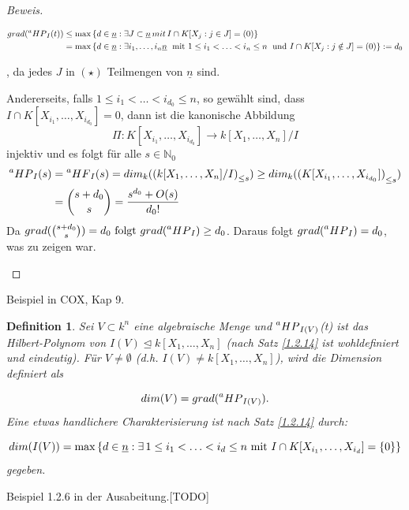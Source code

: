 \documentclass{article}
\newtheorem{definition}[satz]{Definition}
\newcommand*{\R}{k[X_{1},\ldots,X_{n}]}
\newcommand*{\indx}[2]{{#1}_{#2}}
\newcommand*{\N}{\mathbb{N}_0}
\newcommand*{\hf}[1]{$\prescript{a}{}{HF}_{#1}$}
\newcommand*{\hp}[1]{$\prescript{a}{}{HP}_{#1}$}
\begin{document}
\begin{proof}[Beweis]
\begin{compactenum}
\begin{align*}
grad(\textnormal{\hp{I}}(t))&\leq \max{\{d\in\underline{n}:\exists J\subset\underline{n}\, mit\,I\cap K[\indx{X}{j}:j\in J]=(0)\}}\\&
= \max{\{d\in\underline{n}:\exists \indx{i}{1},\ldots,\indx{i}{n}\underline{n}\; \textnormal{ mit }  1\leq\indx{i}{1}<\ldots<\indx{i}{n}\leq n\;\textnormal{ und }I\cap K[\indx{X}{j}:j\notin J]=(0)\}}:=\indx{d}{0}
\end{align*}

, da jedes $J$ in $(\star)$ Teilmengen von $\underline{n}$ sind.

Andererseits, falls $1\leq\indx{i}{1}<\ldots<\indx{i}{\indx{d}{0}}\leq n$, so gewählt sind, dass $I\cap K[\indx{X}{\indx{i}{1}},\ldots,\indx{X}{\indx{i}{\indx{d}{0}}}]={0}$, dann ist die kanonische Abbildung 
\begin{displaymath}
\Pi:K[\indx{X}{\indx{i}{1}},\ldots,\indx{X}{\indx{i}{\indx{d}{0}}}]\rightarrow\R/I
\end{displaymath}
injektiv und es folgt für alle $ s\in\N$
\begin{align*}
\textnormal{\hp{I}}(s)&=\textnormal{\hf{I}}(s)=\indx{dim}{k}(\indx{(\R/I)}{\leq s})\geq \indx{dim}{k}(\indx{(K[\indx{X}{\indx{i}{1}},\ldots,\indx{X}{\indx{i}{\indx{d}{0}}}])}{\leq s})\\&
=\binom{s+\indx{d}{0}}{s}=\frac{s^{\indx{d}{0}}+O(s)}{\indx{d}{0}!}
\end{align*}
Da $grad(\binom{s+\indx{d}{0}}{s})=\indx{d}{0}\textnormal{ folgt } grad(\textnormal{\hp{I}})\geq \indx{d}{0}$. Daraus folgt $grad(\textnormal{\hp{I}})=\indx{d}{0}$, was zu zeigen war. 
	\end{compactenum}
\end{proof}

Beispiel in COX, Kap 9. \\
\begin{definition}
	Sei $V\subset k^n$ eine algebraische Menge und \hp{I(V)}(t) ist das Hilbert-Polynom von $I(V)\unlhd\R$ (nach Satz \ref{1.2.14} ist wohldefiniert und eindeutig). Für $V\neq\emptyset$ (d.h. $I(V)\neq\R$), wird die Dimension definiert als 
	
\begin{displaymath}
dim(V)=grad(\textnormal{\hp{I(V)}}).
\end{displaymath}
Eine etwas handlichere Charakterisierung ist nach Satz \ref{1.2.14} durch:

\begin{displaymath}
dim(I(V))=\max{\{d\in\underline{n}:\exists{\,} 1\leq\indx{i}{1}<\ldots<\indx{i}{d}\leq n \textnormal{ mit } I\cap K[\indx{X}{\indx{i}{1}},\ldots,\indx{X}{\indx{i}{d}}]=\{0\} \}}
\end{displaymath}
gegeben.\\
\end{definition}
Beispiel 1.2.6 in der Ausabeitung.[TODO] \\
\end{document}
